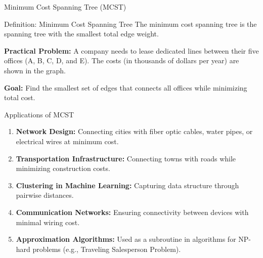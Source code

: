 \documentclass{beamer}
\begin{document}
\begin{frame}{Minimum Cost Spanning Tree (MCST)}
\begin{block}{Definition: Minimum Cost Spanning Tree}
The minimum cost spanning tree is the spanning tree with the smallest total edge weight.
\end{block}

\textbf{Practical Problem:} A company needs to lease dedicated lines between their five offices (A, B, C, D, and E). The costs (in thousands of dollars per year) are shown in the graph.

\begin{center}
\end{center}

\textbf{Goal:} Find the smallest set of edges that connects all offices while minimizing total cost.
\end{frame}

\begin{frame}{Applications of MCST}
\begin{enumerate}
    \item \textbf{Network Design:} Connecting cities with fiber optic cables, water pipes, or electrical wires at minimum cost.
    
    \item \textbf{Transportation Infrastructure:} Connecting towns with roads while minimizing construction costs.
    
    \item \textbf{Clustering in Machine Learning:} Capturing data structure through pairwise distances.
    
    \item \textbf{Communication Networks:} Ensuring connectivity between devices with minimal wiring cost.
    
    \item \textbf{Approximation Algorithms:} Used as a subroutine in algorithms for NP-hard problems (e.g., Traveling Salesperson Problem).
\end{enumerate}
\end{frame}
\end{document}
